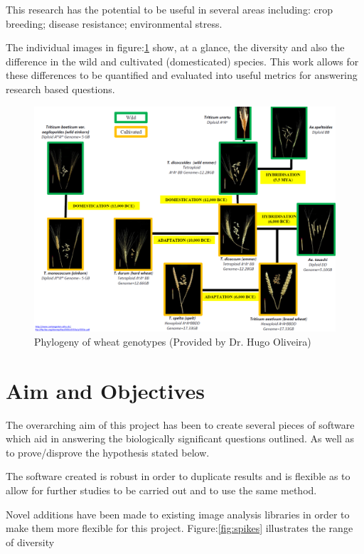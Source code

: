 \documentclass[11pt]{report}
\begin{document}
This research has the potential to be useful in several areas including: crop breeding; disease resistance; environmental stress.

The individual images in figure:\ref{fig:phylo} show, at a glance, the diversity and also the difference in the wild and cultivated (domesticated)
species. This work allows for these differences to be quantified and evaluated into useful metrics for answering research based questions.

\begin{figure}[htb]
\centering
\includegraphics[width=17cm]{./images/philotree.png}
\caption{\label{fig:phylo}Phylogeny of wheat genotypes (Provided by Dr. Hugo Oliveira)}
\end{figure}

\section{Aim and Objectives}
\label{sec-1-4}

The overarching aim of this project has been to create several pieces of software which aid in answering the biologically significant questions outlined. As well as to prove/disprove the hypothesis stated below.

The software created is robust in order to duplicate results and is flexible as to allow for further studies to be carried out and to use the same method.

Novel additions have been made to existing image analysis libraries in order to make them more flexible for this project. Figure:\ref{fig:spikes} illustrates the range of diversity
\end{document}
